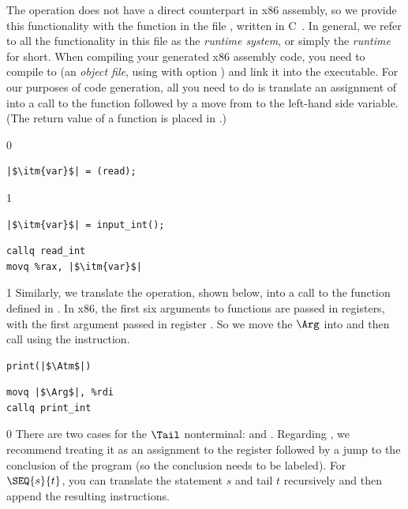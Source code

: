 \documentclass[7x10]{TimesAPriori_MIT}%
\def\racketEd{0}
\def\pythonEd{1}
\def\edition{1}
\newcommand{\pythonColor}[0]{}
\numberwithin{theorem}{chapter}
\numberwithin{definition}{chapter}
\numberwithin{equation}{chapter}
\begin{document}
The \READOP{} operation does not have a direct counterpart in x86
assembly, so we provide this functionality with the function
 in the file , written in
C~\citep{Kernighan:1988nx}. In general, we refer to all the
functionality in this file as the \emph{runtime system}, or simply the \emph{runtime} for short. When compiling your
generated x86 assembly code, you need to compile  to
 (an \emph{object file}, using  with option
) and link it into the executable. For our purposes of code
generation, all you need to do is translate an assignment of
\READOP{} into a call to the  function followed by a
move from  to the left-hand side variable.  (The
return value of a function is placed in .)  
\begin{transformation}
{\if\edition\racketEd  
\begin{lstlisting}
|$\itm{var}$| = (read);
\end{lstlisting}
\fi}
{\if\edition\pythonEd\pythonColor
\begin{lstlisting}
|$\itm{var}$| = input_int();
\end{lstlisting}
\fi}
\compilesto
\begin{lstlisting}
callq read_int
movq %rax, |$\itm{var}$|
\end{lstlisting}
\end{transformation}

{\if\edition\pythonEd\pythonColor
%
Similarly, we translate the  operation, shown below, into
a call to the  function defined in .
In x86, the first six arguments to functions are passed in registers,
with the first argument passed in register . So we move the
$\Arg$ into  and then call  using the
 instruction.
\begin{transformation}
\begin{lstlisting}
print(|$\Atm$|)    
\end{lstlisting}
\compilesto
\begin{lstlisting}
movq |$\Arg$|, %rdi
callq print_int  
\end{lstlisting}
\end{transformation}
%
\fi}  

{\if\edition\racketEd
There are two cases for the $\Tail$ nonterminal:  and
. Regarding , we recommend treating it as an
assignment to the  register followed by a jump to the
conclusion of the program (so the conclusion needs to be labeled).
For $\SEQ{s}{t}$, you can translate the statement $s$ and tail $t$
recursively and then append the resulting instructions.
\fi}
\end{document}
